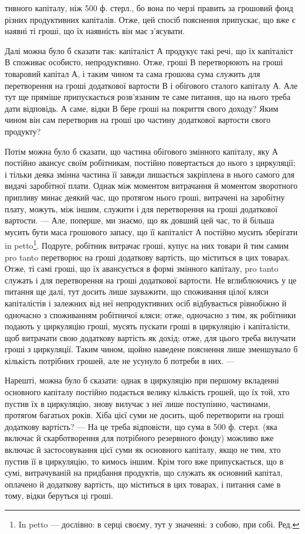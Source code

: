 тивного капіталу, ніж 500 ф. стерл., бо вона по черзі править за грошовий
фонд різних продуктивних капіталів. Отже, цей спосіб пояснення
припускає, що вже є наявні ті гроші, що їх наявність він має з’ясувати.

Далі можна було б сказати так: капіталіст А продукує такі речі, що
їх капіталіст В споживає особисто, непродуктивно. Отже, гроші В перетворюють
на гроші товаровий капітал А, і таким чином та сама грошова
сума служить для перетворення на гроші додаткової вартости В і
обігового сталого капіталу А. Але тут ще пряміше припускається розв’язаним
те саме питання, що на нього треба дати відповідь. А саме, відки
В бере гроші на покриття свого доходу? Яким чином він сам перетворив
на гроші цю частину додаткової вартости свого продукту?

Потім можна було б сказати, що частина обігового змінного капіталу,
яку А постійно авансує своїм робітникам, постійно повертається до нього
з циркуляції; і тільки деяка змінна частина її завжди лишається закріплена
в нього самого для видачі заробітної плати. Однак між моментом
витрачання й моментом зворотного припливу минає деякий час, що
протягом нього гроші, витрачені на заробітну плату, можуть, між іншим,
служити і для перетворення на гроші додаткової вартости. — Але, поперше,
ми знаємо, що як довший цей час, то й більша мусить бути маса грошового
запасу, що її капіталіст А постійно мусить зберігати in petto\footnote*{
In petto — дослівно: в серці своєму, тут у значенні: з собою, при собі. Ред.
}.
Подруге, робітник витрачає гроші, купує на них товари й тим самим
pro tanto перетворює на гроші додаткову вартість, що міститься в цих
товарах. Отже, ті самі гроші, що їх авансується в формі змінного капіталу,
pro tanto служать і для перетворення на гроші додаткової вартости.
Не вглиблюючись у це питання ще далі, тут досить лише зауважити, що
споживання цілої кляси капіталістів і залежних від неї непродуктивних
осіб відбувається рівнобіжно й одночасно з споживанням робітничої кляси;
отже, одночасно з тим, як робітники подають у циркуляцію гроші,
мусять пускати гроші в циркуляцію і капіталісти, щоб витрачати свою
додаткову вартість як дохід; отже, для цього треба вилучати гроші з
циркуляції. Таким чином, щойно наведене пояснення лише зменшувало б
кількість потрібних грошей, але не усунуло б потреби в них. —

Нарешті, можна було б сказати: однак в циркуляцію при першому
вкладенні основного капіталу постійно подається велику кількість грошей,
що їх той, хто пустив їх в циркуляцію, знову вилучає з неї лише поступінно,
частинами, протягом багатьох років. Хіба цієї суми не досить,
щоб перетворити на гроші додаткову вартість? — На це треба відповісти,
що сума в 500 ф. стерл. (яка включає й скарботворення для потрібного
резервного фонду) можливо вже включає й застосовування цієї суми як
основного капіталу, якщо не тим, хто пустив її в циркуляцію, то кимось
іншим. Крім того вже припускається, що в сумі, витрачуваній на
придбання продуктів, що служать як основний капітал, оплачено й додаткову
вартість, що міститься в цих товарах, і питання саме в тому, відки
беруться ці гроші.